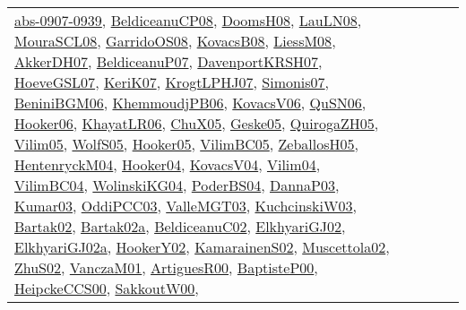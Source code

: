 {\begin{longtable}{lp{3cm}>{\raggedright}p{6cm}>{\raggedright}p{6cm}p{8cm}}
\href{articles/abs-0907-0939.pdf}{abs-0907-0939}\cite{abs-0907-0939}, \href{papers/BeldiceanuCP08.pdf}{BeldiceanuCP08}\cite{BeldiceanuCP08}, \href{papers/DoomsH08.pdf}{DoomsH08}\cite{DoomsH08}, \href{papers/LauLN08.pdf}{LauLN08}\cite{LauLN08}, \href{papers/MouraSCL08.pdf}{MouraSCL08}\cite{MouraSCL08}, \href{articles/GarridoOS08.pdf}{GarridoOS08}\cite{GarridoOS08}, \href{articles/KovacsB08.pdf}{KovacsB08}\cite{KovacsB08}, \href{articles/LiessM08.pdf}{LiessM08}\cite{LiessM08}, \href{papers/AkkerDH07.pdf}{AkkerDH07}\cite{AkkerDH07}, \href{papers/BeldiceanuP07.pdf}{BeldiceanuP07}\cite{BeldiceanuP07}, \href{papers/DavenportKRSH07.pdf}{DavenportKRSH07}\cite{DavenportKRSH07}, \href{papers/HoeveGSL07.pdf}{HoeveGSL07}\cite{HoeveGSL07}, \href{papers/KeriK07.pdf}{KeriK07}\cite{KeriK07}, \href{papers/KrogtLPHJ07.pdf}{KrogtLPHJ07}\cite{KrogtLPHJ07}, \href{articles/Simonis07.pdf}{Simonis07}\cite{Simonis07}, \href{papers/BeniniBGM06.pdf}{BeniniBGM06}\cite{BeniniBGM06}, \href{papers/KhemmoudjPB06.pdf}{KhemmoudjPB06}\cite{KhemmoudjPB06}, \href{papers/KovacsV06.pdf}{KovacsV06}\cite{KovacsV06}, \href{papers/QuSN06.pdf}{QuSN06}\cite{QuSN06}, \href{articles/Hooker06.pdf}{Hooker06}\cite{Hooker06}, \href{articles/KhayatLR06.pdf}{KhayatLR06}\cite{KhayatLR06}, \href{papers/ChuX05.pdf}{ChuX05}\cite{ChuX05}, \href{papers/Geske05.pdf}{Geske05}\cite{Geske05}, \href{papers/QuirogaZH05.pdf}{QuirogaZH05}\cite{QuirogaZH05}, \href{papers/Vilim05.pdf}{Vilim05}\cite{Vilim05}, \href{papers/WolfS05.pdf}{WolfS05}\cite{WolfS05}, \href{articles/Hooker05.pdf}{Hooker05}\cite{Hooker05}, \href{articles/VilimBC05.pdf}{VilimBC05}\cite{VilimBC05}, \href{articles/ZeballosH05.pdf}{ZeballosH05}\cite{ZeballosH05}, \href{papers/HentenryckM04.pdf}{HentenryckM04}\cite{HentenryckM04}, \href{papers/Hooker04.pdf}{Hooker04}\cite{Hooker04}, \href{papers/KovacsV04.pdf}{KovacsV04}\cite{KovacsV04}, \href{papers/Vilim04.pdf}{Vilim04}\cite{Vilim04}, \href{papers/VilimBC04.pdf}{VilimBC04}\cite{VilimBC04}, \href{papers/WolinskiKG04.pdf}{WolinskiKG04}\cite{WolinskiKG04}, \href{articles/PoderBS04.pdf}{PoderBS04}\cite{PoderBS04}, \href{papers/DannaP03.pdf}{DannaP03}\cite{DannaP03}, \href{papers/Kumar03.pdf}{Kumar03}\cite{Kumar03}, \href{papers/OddiPCC03.pdf}{OddiPCC03}\cite{OddiPCC03}, \href{papers/ValleMGT03.pdf}{ValleMGT03}\cite{ValleMGT03}, \href{articles/KuchcinskiW03.pdf}{KuchcinskiW03}\cite{KuchcinskiW03}, \href{papers/Bartak02.pdf}{Bartak02}\cite{Bartak02}, \href{papers/Bartak02a.pdf}{Bartak02a}\cite{Bartak02a}, \href{papers/BeldiceanuC02.pdf}{BeldiceanuC02}\cite{BeldiceanuC02}, \href{papers/ElkhyariGJ02.pdf}{ElkhyariGJ02}\cite{ElkhyariGJ02}, \href{papers/ElkhyariGJ02a.pdf}{ElkhyariGJ02a}\cite{ElkhyariGJ02a}, \href{papers/HookerY02.pdf}{HookerY02}\cite{HookerY02}, \href{papers/KamarainenS02.pdf}{KamarainenS02}\cite{KamarainenS02}, \href{papers/Muscettola02.pdf}{Muscettola02}\cite{Muscettola02}, \href{papers/ZhuS02.pdf}{ZhuS02}\cite{ZhuS02}, \href{papers/VanczaM01.pdf}{VanczaM01}\cite{VanczaM01}, \href{articles/ArtiguesR00.pdf}{ArtiguesR00}\cite{ArtiguesR00}, \href{articles/BaptisteP00.pdf}{BaptisteP00}\cite{BaptisteP00}, \href{articles/HeipckeCCS00.pdf}{HeipckeCCS00}\cite{HeipckeCCS00}, \href{articles/SakkoutW00.pdf}{SakkoutW00}\cite{SakkoutW00}, 
\end{longtable}}
